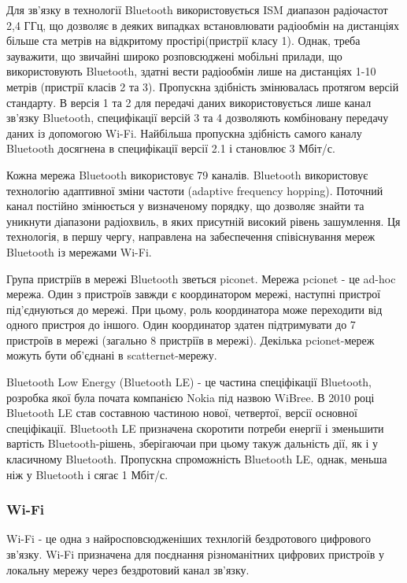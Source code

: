 \documentclass[a4paper,ukrainian,utf8,nocolumnsxix,floatsection,equationsection]{eskdtext}
\renewcommand\paragraph{\subsubsection}
\begin{document}
Для зв’язку в технології Bluetooth використовується ISM диапазон радіочастот 2,4 ГГц, що дозволяє в деяких випадках встановлювати радіообмін на дистанціях більше ста метрів на відкритому простірі(пристрії класу 1). Однак, треба зауважити, що звичайні широко розповсюджені мобільні прилади, що використовують Bluetooth, здатні вести радіообмін лише на дистанціях 1-10 метрів (пристрії класів 2 та 3). Пропускна здібність змінювалась протягом версій стандарту. В версія 1 та 2 для передачі даних використовується лише канал зв’язку Bluetooth, специфікації версій 3 та 4 дозволяють комбіновану передачу даних із допомогою Wi-Fi. Найбільша пропускна здібність самого каналу Bluetooth досягнена в специфікації версії 2.1 \cite{bluetooth:core:spec:2_1} і становлює 3 Мбіт/с.

Кожна мережа Bluetooth використовує 79 каналів. Bluetooth використовує технологію адаптивної зміни частоти (adaptive frequency hopping). Поточний канал постійно змінюється у визначеному порядку, що дозволяє знайти та уникнути діапазони радіохвиль, в яких присутній високий рівень зашумлення. Ця технологія, в першу чергу, направлена на забеспечення співіснування мереж Bluetooth із мережами Wi-Fi.

Група пристріїв в мережі Bluetooth зветься piconet. Мережа pcionet - це ad-hoc мережа. Один з пристроїв завжди є координатором мережі, наступні пристрої під’єднуються до мережі. При цьому, роль координатора може переходити від одного пристроя до іншого. Один координатор здатен підтримувати до 7 пристроїв в мережі (загально 8 пристріїв в мережі). Декілька pcionet-мереж можуть бути об’єднані в scatternet-мережу.

Bluetooth Low Energy (Bluetooth LE) - це частина спеціфікації Bluetooth, розробка якої була почата  компанією Nokia під назвою WiBree. В 2010 році Bluetooth LE став составною частиною нової, четвертої, версії основної спеціфікації. Bluetooth LE призначена скоротити потреби енергії і зменьшити вартість Bluetooth-рішень, зберігаючаи при цьому такуж дальність дії, як і у класичному Bluetooth. Пропускна спроможність Bluetooth LE, однак, меньша ніж у Bluetooth і сягає 1 Мбіт/с.


\paragraph{Wi-Fi} %
\label{par:wi_fi}

Wi-Fi - це одна з найросповсюдженіших технлогій бездротового цифрового зв’язку. Wi-Fi призначена для поєднання різноманітних цифрових пристроїв у локальну мережу через бездротовий канал зв’язку. 
\end{document}
